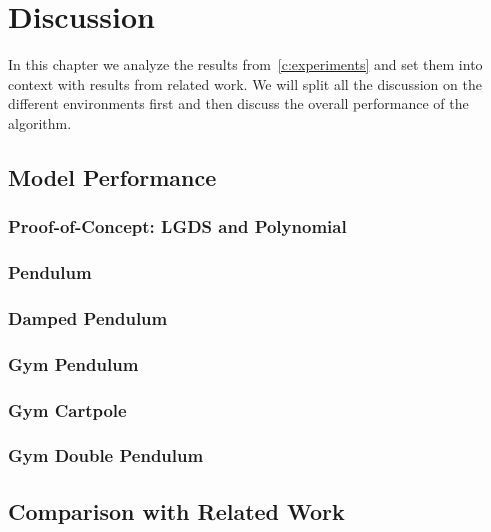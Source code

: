\chapter{Discussion}
\label{c:discussion}



In this chapter we analyze the results from~\autoref{c:experiments} and set them into context with results from related work. We will split all the discussion on the different environments first and then discuss the overall performance of the \algname algorithm.

\section{Model Performance}

	\subsection{Proof-of-Concept: LGDS and Polynomial}

	\subsection{Pendulum}

	\subsection{Damped Pendulum}

	\subsection{Gym Pendulum}

	\subsection{Gym Cartpole}

	\subsection{Gym Double Pendulum}

\section{Comparison with Related Work}

